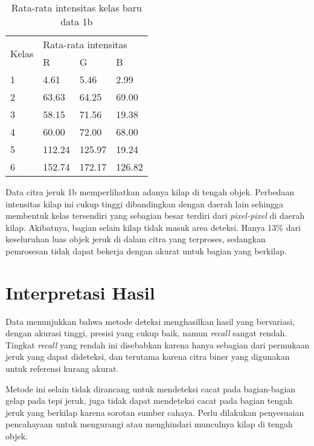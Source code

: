 \documentclass[laporan.tex]{subfiles}
\begin{document}
\begin{table}[h!]
\centering
\begin{tabular}{|l|l|l|l|}
\cline{1-4}
\multirow{2}{*}{Kelas} & \multicolumn{3}{l|}{Rata-rata intensitas} \\
\cline{2-4}
 & R & G & B \\
\cline{1-4}
1 & 4.61 & 5.46 & 2.99 \\
2 & 63.63 & 64.25 & 69.00 \\
3 & 58.15 & 71.56 & 19.38 \\
4 & 60.00 & 72.00 & 68.00 \\
5 & 112.24 & 125.97 & 19.24 \\
6 & 152.74 & 172.17 & 126.82 \\
\cline{1-4}
\end{tabular}
\caption[]{Rata-rata intensitas kelas baru data 1b}
\end{table}

Data citra jeruk 1b memperlihatkan adanya kilap di tengah objek. Perbedaan intensitas kilap ini cukup tinggi dibandingkan dengan daerah lain sehingga membentuk kelas tersendiri yang sebagian besar terdiri dari \emph{pixel-pixel} di daerah kilap. Akibatnya, bagian selain kilap tidak masuk area deteksi. Hanya 13\% dari keseluruhan luas objek jeruk di dalam citra yang terproses, sedangkan pemrosesan tidak dapat bekerja dengan akurat untuk bagian yang berkilap.

\FloatBarrier

\section{Interpretasi Hasil}

Data menunjukkan bahwa metode deteksi menghasilkan hasil yang bervariasi, dengan akurasi tinggi, presisi yang cukup baik, namun \emph{recall} sangat rendah. Tingkat \emph{recall} yang rendah ini disebabkan karena hanya sebagian dari permukaan jeruk yang dapat dideteksi, dan terutama karena citra biner yang digunakan untuk referensi kurang akurat.

Metode ini selain tidak dirancang untuk mendeteksi cacat pada bagian-bagian gelap pada tepi jeruk, juga tidak dapat mendeteksi cacat pada bagian tengah jeruk yang berkilap karena sorotan sumber cahaya. Perlu dilakukan penyesuaian pencahayaan untuk mengurangi atau menghindari munculnya kilap di tengah objek.


\end{document}
